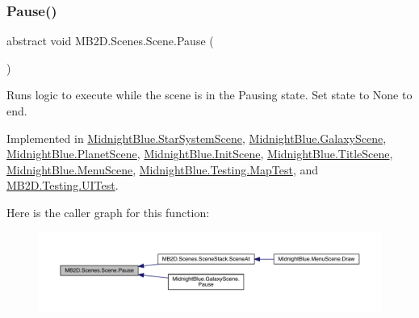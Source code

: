 \subsubsection{\texorpdfstring{Pause()}{Pause()}}
{\footnotesize\ttfamily abstract void M\+B2\+D.\+Scenes.\+Scene.\+Pause (\begin{DoxyParamCaption}{ }\end{DoxyParamCaption})\hspace{0.3cm}{\ttfamily [pure virtual]}}



Runs logic to execute while the scene is in the Pausing state. Set state to None to end. 



Implemented in \hyperlink{class_midnight_blue_1_1_star_system_scene_a04e8bfcb31eebfd859c4bd543f0bb6f9}{Midnight\+Blue.\+Star\+System\+Scene}, \hyperlink{class_midnight_blue_1_1_galaxy_scene_aeb44afaeda2cccd225e64908bb76bee4}{Midnight\+Blue.\+Galaxy\+Scene}, \hyperlink{class_midnight_blue_1_1_planet_scene_abc077e1cd5f40879ca3af4224f0ff455}{Midnight\+Blue.\+Planet\+Scene}, \hyperlink{class_midnight_blue_1_1_init_scene_adbcab013e715e5c49ad09bcd0545d994}{Midnight\+Blue.\+Init\+Scene}, \hyperlink{class_midnight_blue_1_1_title_scene_a046934bfa3290d443b58bcc1de0919db}{Midnight\+Blue.\+Title\+Scene}, \hyperlink{class_midnight_blue_1_1_menu_scene_a7a2f8875f949d2ec2e6f3a8c6da7cedf}{Midnight\+Blue.\+Menu\+Scene}, \hyperlink{class_midnight_blue_1_1_testing_1_1_map_test_a7dba960137d634b15e4f4b7b3a86489f}{Midnight\+Blue.\+Testing.\+Map\+Test}, and \hyperlink{class_m_b2_d_1_1_testing_1_1_u_i_test_ae829ddfd489047674efb3131d360901a}{M\+B2\+D.\+Testing.\+U\+I\+Test}.

Here is the caller graph for this function\+:\nopagebreak
\begin{figure}[H]
\begin{center}
\leavevmode
\includegraphics[width=350pt]{class_m_b2_d_1_1_scenes_1_1_scene_a0661eff0223150fa8e9ea88145409e5d_icgraph}
\end{center}
\end{figure}
\hypertarget{class_m_b2_d_1_1_scenes_1_1_scene_ad13639db22b059a1b714eefd9d927735}{}\label{class_m_b2_d_1_1_scenes_1_1_scene_ad13639db22b059a1b714eefd9d927735} 
